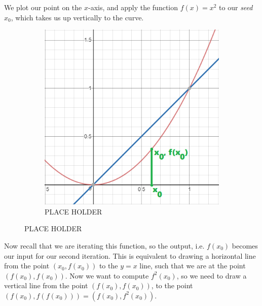 \documentclass[20pt]{article} %
\begin{document}
\newpage
We plot our point on the $x$-axis, and apply the function $f(x)=x^{2}$ to our \textit{seed} $x_0$, which takes us up vertically to the curve.
\begin{figure}[!htbp]
  	\centering
   	\begin{subfigure}[p]{0.5\linewidth}
    	\includegraphics[width=\linewidth]{./figures/fp-2.png}
	\caption{PLACE HOLDER}
   	\end{subfigure}
\end{figure} 

Now recall that we are iterating this function, so the output, i.e. $f(x_0)$ becomes our input for our second iteration.  This is equivalent to drawing a horizontal line from the point $(x_0, f(x_0))$ to the $y=x$ line, such that we are at the point $(f(x_0), f(x_0))$.  Now we want to compute $f^{2}(x_0)$, so we need to draw a vertical line from the point $(f(x_0), f(x_0))$, to the point $(f(x_0), f(f(x_0))) = (f(x_0), f^{2}(x_0))$.
\end{document}
